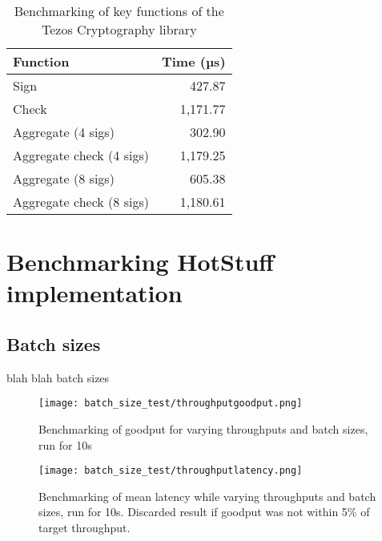 \begin{table}[!h]
	\centering
	\begin{tabular}{|l|r|}
	\hline
	Function                 & Time (µs) \\ \hline
	Sign                     & 427.87   \\
	Check                    & 1,171.77 \\
	Aggregate (4 sigs)       & 302.90   \\
	Aggregate check (4 sigs) & 1,179.25 \\
	Aggregate (8 sigs)       & 605.38   \\
	Aggregate check (8 sigs) & 1,180.61 \\ \hline
	\end{tabular}
	\caption{Benchmarking of key functions of the Tezos Cryptography library}
\end{table}

\section{Benchmarking HotStuff implementation}
\subsection{Batch sizes}
blah blah batch sizes

\begin{figure}[h!]
\centering
\texttt{[image: batch\_size\_test/throughputgoodput.png]}
\caption{Benchmarking of goodput for varying throughputs and batch sizes, run for 10s}
\end{figure}

\begin{figure}[h!]
\centering
\texttt{[image: batch\_size\_test/throughputlatency.png]}
\caption{Benchmarking of mean latency while varying throughputs and batch sizes, run for 10s. Discarded result if goodput was not within 5\% of target throughput.}
\end{figure}

